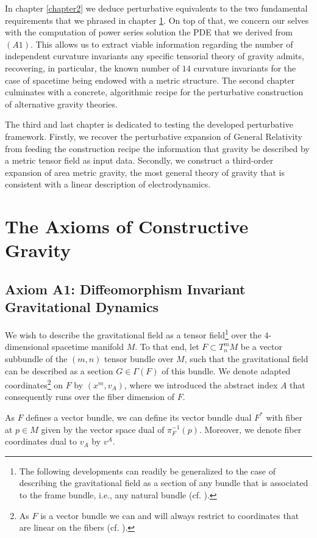 \documentclass[%
 reprint,
nofootinbib,
 amsmath,amssymb,
 aps,
 prd,
floatfix,
]{revtex4-2}
\begin{document}
In chapter \ref{chapter2} we deduce perturbative equivalents to the two fundamental requirements that we phrased in chapter \ref{chapter1}. On top of that, we concern our selves with the computation of power series solution the PDE that we derived from $(A1)$. This allows us to extract viable information regarding the number of independent curvature invariants any specific tensorial theory of gravity admits, recovering, in particular, the known number of $14$ curvature invariants for the case of spacetime being endowed with a metric structure. 
The second chapter culminates with a concrete, algorithmic recipe for the perturbative construction of alternative gravity theories. 

The third and last chapter is dedicated to testing the developed perturbative framework. Firstly, we recover the perturbative expansion of General Relativity from feeding the construction recipe the information that gravity be described by a metric tensor field as input data.
Secondly, we construct a third-order expansion of area metric gravity, the most general theory of gravity that is consistent with a linear description of electrodynamics.

\section{The Axioms of Constructive Gravity}\label{chapter1}
\subsection{Axiom A1: Diffeomorphism Invariant Gravitational Dynamics }

We wish to describe the gravitational field as a tensor field\footnote{The following developments can readily be generalized to the case of describing the gravitational field as a section of any bundle that is associated to the frame bundle, i.e., any natural bundle (cf. \cite{kolar1993natural}).} over the $4$-dimensional spacetime manifold $M$. To that end, let $F \subset T^m_nM$ be a vector subbundle of the $(m,n)$ tensor bundle over $M$, such that the gravitational field can be described as a section $G \in \Gamma(F)$ of this bundle. 
We denote adapted coordinates\footnote{As $F$ is a vector bundle we can and will always restrict to coordinates that are linear on the fibers (cf. \cite{saunders_1989}).} on $F$ by $(x^m,v_A)$, where we introduced the abstract index $A$ that consequently runs over the fiber dimension of $F$.

As $F$ defines a vector bundle, we can define its vector bundle dual $F^{\ast}$ with fiber at $p\in M$ given by the vector space dual of $\pi_F^{-1}(p)$.
Moreover, we denote fiber coordinates dual to $v_A$ by $v^A$.
\end{document}
